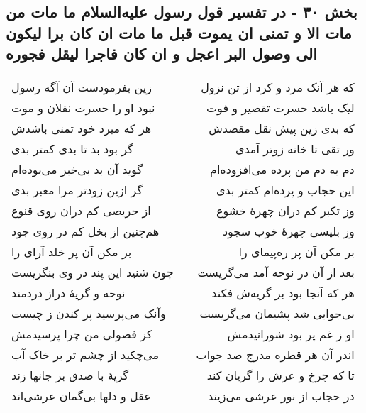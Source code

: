 \begin{center}
\section*{بخش ۳۰ - در تفسیر قول رسول علیه‌السلام ما مات من مات الا و تمنی ان یموت قبل ما مات ان کان برا لیکون الی وصول البر اعجل و ان کان فاجرا لیقل فجوره}
\label{sec:sh030}
\begin{longtable}{l p{0.5cm} r}
زین بفرمودست آن آگه رسول
&&
که هر آنک مرد و کرد از تن نزول
\\
نبود او را حسرت نقلان و موت
&&
لیک باشد حسرت تقصیر و فوت
\\
هر که میرد خود تمنی باشدش
&&
که بدی زین پیش نقل مقصدش
\\
گر بود بد تا بدی کمتر بدی
&&
ور تقی تا خانه زوتر آمدی
\\
گوید آن بد بی‌خبر می‌بوده‌ام
&&
دم به دم من پرده می‌افزوده‌ام
\\
گر ازین زودتر مرا معبر بدی
&&
این حجاب و پرده‌ام کمتر بدی
\\
از حریصی کم دران روی قنوع
&&
وز تکبر کم دران چهرهٔ خشوع
\\
هم‌چنین از بخل کم در روی جود
&&
وز بلیسی چهرهٔ خوب سجود
\\
بر مکن آن پر خلد آرای را
&&
بر مکن آن پر ره‌پیمای را
\\
چون شنید این پند در وی بنگریست
&&
بعد از آن در نوحه آمد می‌گریست
\\
نوحه و گریهٔ دراز دردمند
&&
هر که آنجا بود بر گریه‌ش فکند
\\
وآنک می‌پرسید پر کندن ز چیست
&&
بی‌جوابی شد پشیمان می‌گریست
\\
کز فضولی من چرا پرسیدمش
&&
او ز غم پر بود شورانیدمش
\\
می‌چکید از چشم تر بر خاک آب
&&
اندر آن هر قطره مدرج صد جواب
\\
گریهٔ با صدق بر جانها زند
&&
تا که چرخ و عرش را گریان کند
\\
عقل و دلها بی‌گمان عرشی‌اند
&&
در حجاب از نور عرشی می‌زیند
\\
\end{longtable}
\end{center}
